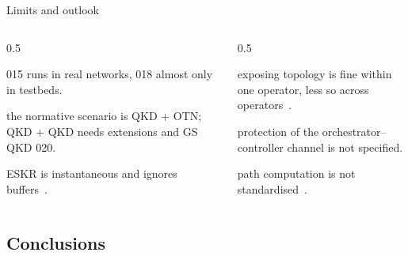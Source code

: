 \documentclass[10pt]{beamer}
\begin{document}
\begin{frame}{Limits and outlook}
  \begin{columns}[T]
    \begin{column}{0.5\textwidth}
      \begin{description}\small
        \item[Adoption] 015 runs in real networks, 018 almost only in
              testbeds.
        \item[Multi-domain] the normative scenario is QKD + OTN; QKD + QKD
              needs extensions and GS QKD 020.
        \item[Metrics] ESKR is instantaneous and ignores buffers~\cite{laschet2026}.
      \end{description}
    \end{column}
    \begin{column}{0.5\textwidth}
      \begin{description}[Confidentiality]\small
        \item[Confidentiality] exposing topology is fine within one
              operator, less so across operators~\cite{laschet2026,interconnect2026}.
        \item[Security] protection of the orchestrator–controller channel
              is not specified.
        \item[Algorithms] path computation is not standardised~\cite{routing2024,mendez2026}.
      \end{description}
    \end{column}
  \end{columns}
\end{frame}

\subsection{Conclusions}
\end{document}
